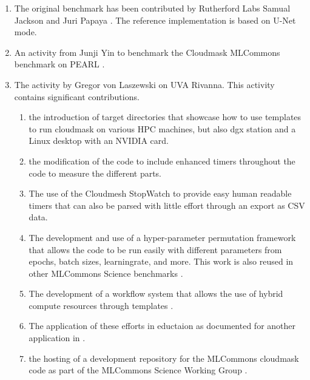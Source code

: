 \documentclass[sigplan,screen]{acmart}
\begin{document}
\begin{enumerate}
\item The original benchmark has been contributed by Rutherford Labs Samual Jackson  and Juri Papaya \cite{Thiyagalingam2022AIBF}.
The reference implementation is based on U-Net \cite{Ronneberger2015UNetCN} mode. 

\item An activity from Junji Yin to benchmark the Cloudmask MLCommons benchmark on PEARL \cite{Thiyagalingam2022AIBF}.

\item The activity by Gregor von Laszewski on UVA Rivanna. This activity contains significant contributions. 

    \begin{enumerate} 

    \item the introduction of target directories that showcase how to use templates to run cloudmask on various HPC machines, but also dgx station and a Linux desktop with an NVIDIA card.

    \item the modification of the code to include enhanced timers throughout the code to measure the different parts.

    \item The use of the Cloudmesh StopWatch to provide easy human readable timers that can also be parsed with little effort through an export as CSV data.

    \item The development and use of a hyper-parameter permutation framework that allows the code to be run easily with different parameters from epochs, batch sizes, learningrate, and more. This work is also reused in other MLCommons Science benchmarks \cite{las22-cloudmesh-cc-reu}.

    \item The development of a workflow system that allows the use of hybrid compute resources through templates \cite{las-2023-escience-cloudmask} .

    \item The application of these efforts in eductaion as documented for another application in \cite{las-2023-mlcommons-edu-eq}.

    \item the hosting of a development repository for the MLCommons cloudmask code as part of the MLCommons Science Working Group \cite{github-laszewsk-mlcommons}.


\end{enumerate}
\end{enumerate}
\end{document}
